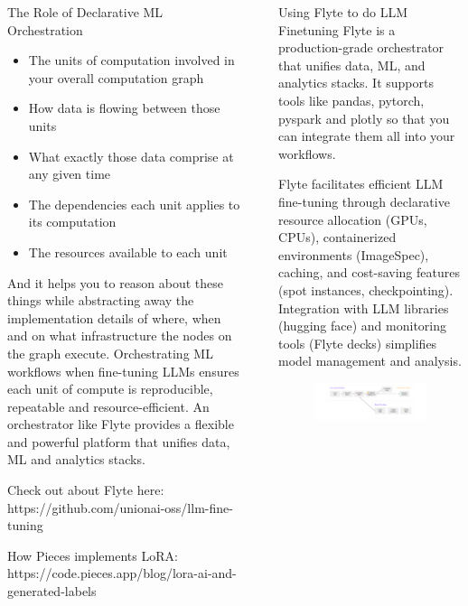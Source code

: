 \documentclass[final]{beamer}
\newlength{\sepwidth}
\newlength{\colwidth}
\newcommand{\separatorcolumn}{\begin{column}{\sepwidth}\end{column}}
\begin{document}
\begin{frame}[t]
\begin{columns}[t]
\begin{column}{\colwidth}
\begin{block}{The Role of Declarative ML Orchestration}
    \begin{itemize}
    \item The units of computation involved in your overall computation graph
    \item How data is flowing between those units
    \item What exactly those data comprise at any given time
    \item The dependencies each unit applies to its computation
    \item The resources available to each unit 
    \end{itemize}
    
    And it helps you to reason about these things while abstracting away the implementation details of where, when and on what infrastructure the nodes on the graph execute. Orchestrating ML workflows when fine-tuning LLMs ensures each unit of compute is reproducible, repeatable and resource-efficient. An orchestrator like Flyte provides a flexible and powerful platform that unifies data, ML and analytics stacks.

    Check out about Flyte here: https://github.com/unionai-oss/llm-fine-tuning

    How Pieces implements LoRA: https://code.pieces.app/blog/lora-ai-and-generated-labels
  \end{block}

\end{column}

\separatorcolumn

\begin{column}{\colwidth}

  \begin{exampleblock}{Using Flyte to do LLM Finetuning}
Flyte is a production-grade orchestrator that unifies data, ML, and analytics stacks. It supports tools like pandas, pytorch, pyspark and plotly so that you can integrate them all into your workflows.

Flyte facilitates efficient LLM fine-tuning through declarative resource allocation (GPUs, CPUs), containerized environments (ImageSpec), caching, and cost-saving features (spot instances, checkpointing). Integration with LLM libraries (hugging face) and monitoring tools (Flyte decks) simplifies model management and analysis.

\begin{figure}
\centering
\includegraphics[width=0.7\columnwidth]{logos/flowchart.png}
\end{figure}
\end{exampleblock}


\end{column}
\end{columns}
\end{frame}
\end{document}
